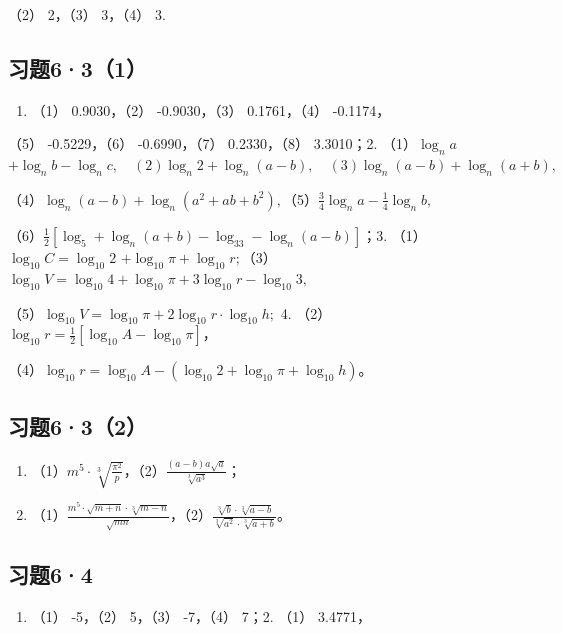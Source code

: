 （2） 2，（3） 3，（4） 3.

\subsection{习题6·3（1）}

\begin{enumerate}
\item
  （1） 0.9030，（2） -0.9030，（3） 0.1761，（4） -0.1174，
\end{enumerate}

（5） -0.5229，（6） -0.6990，（7） 0.2330，（8） 3.3010；2.
（1）\(\log_n a\)
\(+\log_{n}b - \log_{n}c,\quad (2)\log_{n}2 + \log_{n}(a - b),\quad (3)\log_{n}(a - b) + \log_{n}(a + b),\)

（4）\(\log_{n}(a - b) + \log_{n}(a^{2} + ab + b^{2}),\)（5）\(\frac{3}{4}\log_{n}a - \frac{1}{4}\log_{n}b,\)

（6）\(\frac{1}{2} [\log_5 + \log_n(a + b) - \log_33 - \log_n(a - b)]\)；3.
（1）\(\log_{10} C = \log_{10} 2\)
\(+\log_{10}\pi + \log_{10}r;\)（3）\(\log_{10}V = \log_{10}4 + \log_{10}\pi + 3\log_{10}r - \log_{10}3,\)

（5）\(\log_{10} V = \log_{10} \pi + 2 \log_{10} r \cdot \log_{10} h;\)
4. （2）\(\log_{10} r = \frac{1}{2} [\log_{10} A - \log_{10} \pi]\)，

（4）\(\log_{10} r = \log_{10} A - (\log_{10} 2 + \log_{10} \pi + \log_{10} h)\)。

\subsection{习题6·3（2）}

\begin{enumerate}[start=2]
\item
  （1）\(m^5 \cdot \sqrt[3]{\frac{\pi^2}{p}}\)，（2）\(\frac{(a - b)a\sqrt{a}}{\sqrt[3]{a^3}}\)；
\item
  （1）\(\frac{m^5 \cdot \sqrt{m + n} \cdot \sqrt[3]{m - n}}{\sqrt{mn}}\)，（2）\(\frac{\sqrt[3]{b} \cdot \sqrt[3]{a - b}}{\sqrt[3]{a^2} \cdot \sqrt[3]{a + b}}\)。
\end{enumerate}

\subsection{习题6·4}

\begin{enumerate}
\item
  （1） -5，（2） 5，（3） -7，（4） 7；2. （1） 3.4771，
\end{enumerate}

